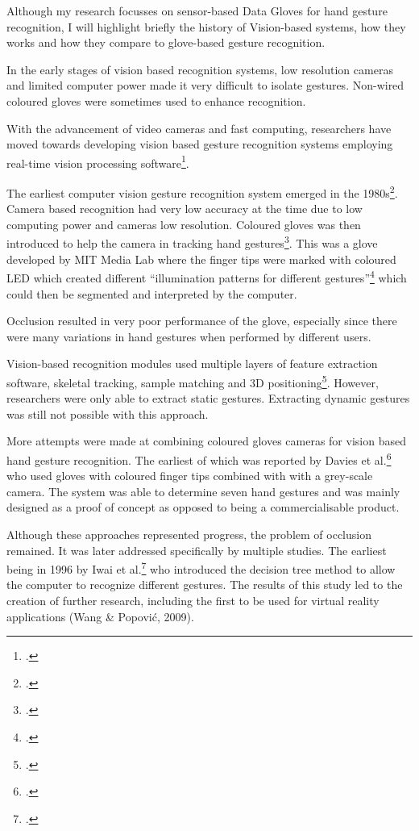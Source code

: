 Although my research focusses on sensor-based Data Gloves for hand gesture recognition, I will highlight briefly the history of Vision-based systems, how they works and how they compare to glove-based gesture recognition.

In the early stages of vision based recognition systems, low resolution cameras and limited computer power made it very difficult to isolate gestures. Non-wired coloured gloves were sometimes used to enhance recognition.

With the advancement of video cameras and fast computing, researchers have moved towards developing vision based gesture recognition systems employing real-time vision processing software\footcite{Pavlovic1997}.

The earliest computer vision gesture recognition system emerged in the 1980s\footcite{Premaratne2010}. Camera based recognition had very low accuracy at the time due to low computing power and cameras low resolution. Coloured gloves was then introduced to help the camera in tracking hand gestures\footcite{James1994}. This was a glove developed by MIT Media Lab where the finger tips were marked with coloured LED which created different ``illumination patterns for different gestures''\footcite{Sturman1994} which could then be segmented and interpreted by the computer. 

Occlusion resulted in very poor performance of the glove, especially since there were many variations in hand gestures when performed by different users. 

Vision-based recognition modules used multiple layers of feature extraction software, skeletal tracking, sample matching and 3D positioning\footcite{Berci2007}. However, researchers were only able to extract static gestures. Extracting dynamic gestures was still not possible with this approach. 

More attempts were made at combining coloured gloves cameras for vision based hand gesture recognition. The earliest of which was reported by Davies et al.\footcite{James1994} who used gloves with coloured finger tips combined with with a grey-scale camera. The system was able to determine seven hand gestures and was mainly designed as a proof of concept as opposed to being a commercialisable product. 

Although these approaches represented progress, the problem of occlusion remained. It was later addressed specifically by multiple studies. The earliest being in 1996 by Iwai et al.\footcite{Iwai1996} who introduced the decision tree method to allow the computer to recognize different gestures. The results of this study led to the creation of further research, including the first to be used for virtual reality applications (Wang \& Popović, 2009). 

